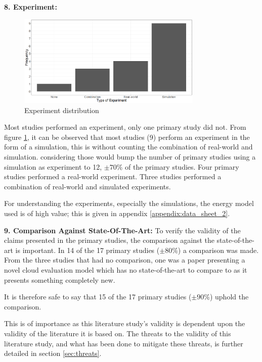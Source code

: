 \noindent\textbf{8. Experiment:}
\begin{figure}
    \includegraphics[width=250pt]{figures/experiment_distr.png}
    \caption{Experiment distribution}
    \label{fig:experiment_distr}
\end{figure}
Most studies performed an experiment, only one primary study did not.
From figure \ref{fig:experiment_distr}, it can be observed that most studies (9) perform an experiment in the form of a simulation, 
this is without counting the combination of real-world and simulation.
considering those would bump the number of primary studies using a simulation as experiment to 12, $\pm 70\%$ of the primary studies.
Four primary studies performed a real-world experiment.
Three studies performed a combination of real-world and simulated experiments.

For understanding the experiments, especially the simulations, the energy model used is of high value; this is given in appendix \ref{appendix:data_sheet_2}.

\vspace{2mm}

\noindent\textbf{9. Comparison Against State-Of-The-Art:}
To verify the validity of the claims presented in the primary studies, the comparison against the state-of-the-art is important.
In 14 of the 17 primary studies ($\pm 80\%$) a comparison was made.
From the three studies that had no comparison, one was a paper presenting a novel cloud evaluation model \cite{hou2017novel_cloud_evaluation_model}
which has no state-of-the-art to compare to as it presents something completely new.

\vspace{2mm}

It is therefore safe to say that 15 of the 17 primary studies ($\pm 90\%$) uphold the comparison.

\vspace{2mm}

This is of importance as this literature study's validity is dependent upon the validity of the literature it is based on.
The threats to the validity of this literature study, and what has been done to mitigate these threats,
is further detailed in section \ref{sec:threats}.

